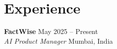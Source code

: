 \documentclass[10pt,a4paper]{article}
\begin{document}
\section*{Experience}

\textbf{FactWise} \hfill May 2025 -- Present \\
\textit{AI Product Manager} \hfill Mumbai, India
\end{document}
